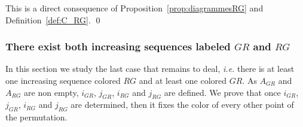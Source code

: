 \documentclass[11pt]{article}
\newenvironment{pf}{{\em \noindent Proof:}}{ \hfill \qed\smallskip}
\begin{document}
\begin{pf}
This is a direct consequence of Proposition~\ref{prop:diagrammesRG} and Definition~\ref{def:C_RG}.
\end{pf}


\subsubsection{There exist both increasing sequences labeled $GR$ and $RG$}

In this section we study the last case that remains to deal, 
{\em i.e.} there is at least one increasing sequence colored $RG$ and at least one colored $GR$.
As $A_{GR}$ and $A_{RG}$ are non empty, $i_{GR}$, $j_{GR}$, $i_{RG}$ and $j_{RG}$ are defined.
We prove that once $i_{GR}$, $j_{GR}$, $i_{RG}$ and $j_{RG}$ are determined, then it fixes the color of every other point of the permutation.
\end{document}
